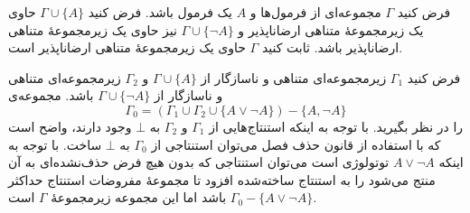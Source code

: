 فرض کنید $\Gamma$ مجموعه‌ای از فرمول‌ها و $A$ یک فرمول باشد. فرض کنید $\Gamma\cup \{A\}$ حاوی یک زیرمجموعهٔ متناهی ارضاناپذیر و $\Gamma\cup\{\neg A\}$ نیز حاوی یک زیرمجموعهٔ متناهی ارضاناپذیر باشد. ثابت کنید $\Gamma$ حاوی یک زیرمجموعهٔ متناهی ارضاناپذیر است.
\begin{ans}
  فرض کنید $\Gamma_1$ زیرمجموعه‌ای متناهی و ناسازگار از
  $\Gamma\cup \{A\}$
  و
  $\Gamma_2$
  زیرمجموعه‌ای متناهی و ناسازگار از
  $\Gamma\cup\{\neg A\}$
  باشد. مجموعه‌ی
  $$\Gamma_0=(\Gamma_1\cup\Gamma_2\cup\{A\vee\neg A\})-\{A,\neg A\}$$
  را در نظر بگیرید. با توجه به اینکه استنتاج‌هایی از $\Gamma_1$ و $\Gamma_2$ به $\bot$ وجود دارند، واضح است که با استفاده از قانون حذف فصل می‌توان استنتاجی از $\Gamma_0$ به $\bot$ ساخت. با توجه به اینکه $A\vee\neg A$ توتولوژی است می‌توان استنتاجی که بدون هیچ فرض حذف‌نشده‌ای به آن منتج می‌شود را به استنتاج ساخته‌شده افزود تا مجموعهٔ مفروضات استنتاج حداکثر
  $\Gamma_0-\{A\vee\neg A\}$ باشد
  اما این مجموعه زیرمجموعهٔ $\Gamma$ است.
\end{ans}